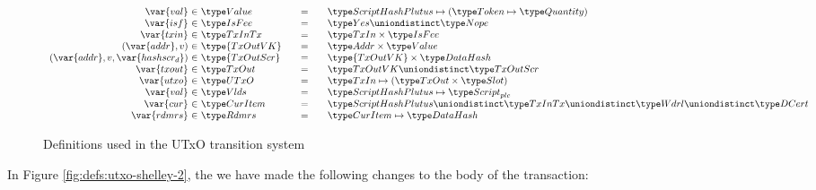\begin{figure*}[htb]
\begin{equation*}
    \begin{array}{r@{~\in~}l@{\qquad=\qquad}lr}
      \var{val} & \Value
      & \ScriptHashPlutus \mapsto (\Token \mapsto \Quantity)
      \\
      \var{isf}
      & \IsFee
      & \Yes \uniondistinct \Nope
      \\
      \var{txin}
      & \TxInTx
      & \TxIn \times \IsFee
      \\
      (\var{addr}, v)
      & \type{TxOutVK}
      & \Addr \times \Value
      \\
      (\var{addr}, v, \var{hashscr_d})
      & \type{TxOutScr}
      & \type{TxOutVK} \times \DataHash
      \\
      \var{txout}
      & \TxOut
      & \TxOutVK \uniondistinct \TxOutScr
      \\
      \var{utxo}
      & \UTxO
      & \TxIn \mapsto (\TxOut \times \Slot)
      \\
      \var{val}
      & \Vlds
      & \ScriptHashPlutus \mapsto \ScriptPlutus
      \\
      \var{cur}
      & \CurItem
      & \ScriptHashPlutus \uniondistinct \TxInTx \uniondistinct \Wdrl \uniondistinct \DCert
      \\
      \var{rdmrs}
      & \Rdmrs
      & \CurItem \mapsto \DataHash
    \end{array}
  \end{equation*}
  \caption{Definitions used in the UTxO transition system}
  \label{fig:defs:utxo-shelley-1}
\end{figure*}

In Figure \ref{fig:defs:utxo-shelley-2}, the we have made the following changes to
the body of the transaction:

